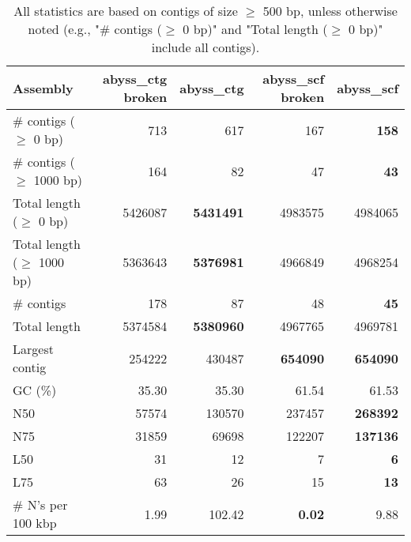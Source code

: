\documentclass[12pt,a4paper]{article}
\begin{document}
\begin{table}[ht]
\begin{center}
\caption{All statistics are based on contigs of size $\geq$ 500 bp, unless otherwise noted (e.g., "\# contigs ($\geq$ 0 bp)" and "Total length ($\geq$ 0 bp)" include all contigs).}
\begin{tabular}{|l*{4}{|r}|}
\hline
Assembly & abyss\_ctg broken & abyss\_ctg & abyss\_scf broken & abyss\_scf \\ \hline
\# contigs ($\geq$ 0 bp) & 713 & 617 & 167 & {\bf 158} \\ \hline
\# contigs ($\geq$ 1000 bp) & 164 & 82 & 47 & {\bf 43} \\ \hline
Total length ($\geq$ 0 bp) & 5426087 & {\bf 5431491} & 4983575 & 4984065 \\ \hline
Total length ($\geq$ 1000 bp) & 5363643 & {\bf 5376981} & 4966849 & 4968254 \\ \hline
\# contigs & 178 & 87 & 48 & {\bf 45} \\ \hline
Total length & 5374584 & {\bf 5380960} & 4967765 & 4969781 \\ \hline
Largest contig & 254222 & 430487 & {\bf 654090} & {\bf 654090} \\ \hline
GC (\%) & 35.30 & 35.30 & 61.54 & 61.53 \\ \hline
N50 & 57574 & 130570 & 237457 & {\bf 268392} \\ \hline
N75 & 31859 & 69698 & 122207 & {\bf 137136} \\ \hline
L50 & 31 & 12 & 7 & {\bf 6} \\ \hline
L75 & 63 & 26 & 15 & {\bf 13} \\ \hline
\# N's per 100 kbp & 1.99 & 102.42 & {\bf 0.02} & 9.88 \\ \hline
\end{tabular}
\end{center}
\end{table}
\end{document}
